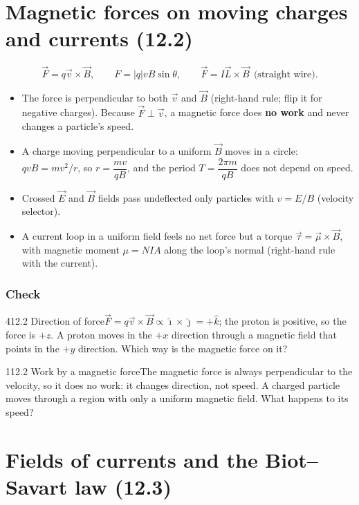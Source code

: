 \documentclass[11pt]{article}
\begin{document}
\section{Magnetic forces on moving charges and currents (12.2)}\label{sec:2}

\[ \vec F = q\vec v\times\vec B, \qquad F = |q|vB\sin\theta, \qquad \vec F = I\vec L\times\vec B\ \ \text{(straight wire)}. \]
\begin{itemize}
\item The force is perpendicular to both $\vec v$ and $\vec B$ (right-hand rule; flip it for negative charges). Because $\vec F \perp \vec v$, a magnetic force does \textbf{no work} and never changes a particle's speed.
\item A charge moving perpendicular to a uniform $\vec B$ moves in a circle: $qvB = mv^2/r$, so $r = \dfrac{mv}{qB}$, and the period $T = \dfrac{2\pi m}{qB}$ does not depend on speed.
\item Crossed $\vec E$ and $\vec B$ fields pass undeflected only particles with $v = E/B$ (velocity selector).
\item A current loop in a uniform field feels no net force but a torque $\vec\tau = \vec\mu\times\vec B$, with magnetic moment $\mu = NIA$ along the loop's normal (right-hand rule with the current).
\end{itemize}

\subsubsection{Check}\mbox{}

\begin{q}{4}{12.2 Direction of force}{$\vec F = q\vec v\times\vec B \propto \hat\imath\times\hat\jmath = +\hat k$; the proton is positive, so the force is $+z$.}
A proton moves in the $+x$ direction through a magnetic field that points in the $+y$ direction. Which way is the magnetic force on it?
\end{q}
\begin{q}{1}{12.2 Work by a magnetic force}{The magnetic force is always perpendicular to the velocity, so it does no work: it changes direction, not speed.}
A charged particle moves through a region with only a uniform magnetic field. What happens to its speed?
\end{q}

\section{Fields of currents and the Biot--Savart law (12.3)}\label{sec:3}
\end{document}

